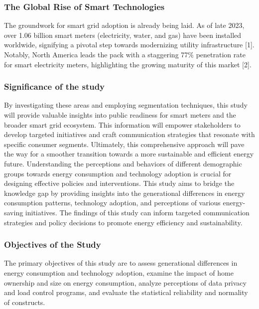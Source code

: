 \documentclass[
  letterpaper,
  DIV=11,
  numbers=noendperiod]{scrartcl}
\begin{document}
\subsubsection{The Global Rise of Smart
Technologies}\label{the-global-rise-of-smart-technologies}

The groundwork for smart grid adoption is already being laid. As of late
2023, over 1.06 billion smart meters (electricity, water, and gas) have
been installed worldwide, signifying a pivotal step towards modernizing
utility infrastructure {[}1{]}. Notably, North America leads the pack
with a staggering 77\% penetration rate for smart electricity meters,
highlighting the growing maturity of this market {[}2{]}.

\subsubsection{Significance of the
study}\label{significance-of-the-study}

By investigating these areas and employing segmentation techniques, this
study will provide valuable insights into public readiness for smart
meters and the broader smart grid ecosystem. This information will
empower stakeholders to develop targeted initiatives and craft
communication strategies that resonate with specific consumer segments.
Ultimately, this comprehensive approach will pave the way for a smoother
transition towards a more sustainable and efficient energy future.
Understanding the perceptions and behaviors of different demographic
groups towards energy consumption and technology adoption is crucial for
designing effective policies and interventions. This study aims to
bridge the knowledge gap by providing insights into the generational
differences in energy consumption patterns, technology adoption, and
perceptions of various energy-saving initiatives. The findings of this
study can inform targeted communication strategies and policy decisions
to promote energy efficiency and sustainability.

\subsubsection{Objectives of the Study}\label{objectives-of-the-study}

The primary objectives of this study are to assess generational
differences in energy consumption and technology adoption, examine the
impact of home ownership and size on energy consumption, analyze
perceptions of data privacy and load control programs, and evaluate the
statistical reliability and normality of constructs.
\end{document}
